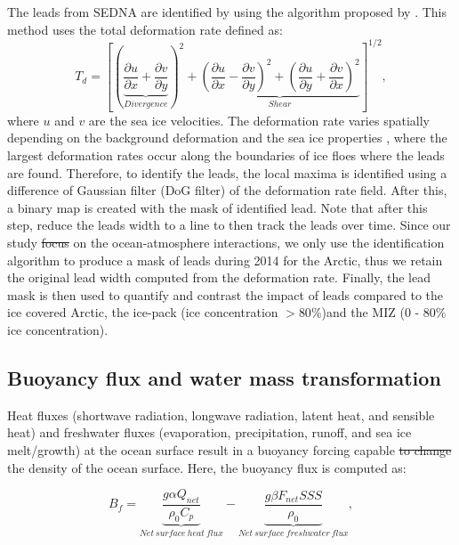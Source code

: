 \documentclass[lineno,sn-basic]{sn-jnl}%
\providecommand{\DIFadd}[1]{{\protect\color{blue}\uwave{#1}}} %
\providecommand{\DIFdel}[1]{{\protect\color{red}\sout{#1}}}                      %
\providecommand{\DIFaddbegin}{} %
\providecommand{\DIFaddend}{} %
\providecommand{\DIFdelbegin}{} %
\providecommand{\DIFdelend}{} %
\newcommand{\DIFscaledelfig}{0.5}
\newlength{\DIFdelgraphicswidth} %
\newlength{\DIFdelgraphicsheight} %
\newcommand{\DIFaddincludegraphics}[2][]{{\color{blue}\fbox{\DIFOincludegraphics[#1]{#2}}}} %
\newcommand{\DIFdelincludegraphics}[2][]{%
\sbox{\DIFdelgraphicsbox}{\DIFOincludegraphics[#1]{#2}}%
\settoboxwidth{\DIFdelgraphicswidth}{\DIFdelgraphicsbox} %
\settoboxtotalheight{\DIFdelgraphicsheight}{\DIFdelgraphicsbox} %
\scalebox{\DIFscaledelfig}{%
\parbox[b]{\DIFdelgraphicswidth}{\usebox{\DIFdelgraphicsbox}\\[-\baselineskip] \rule{\DIFdelgraphicswidth}{0em}}\llap{\resizebox{\DIFdelgraphicswidth}{\DIFdelgraphicsheight}{%
\setlength{\unitlength}{\DIFdelgraphicswidth}%
\begin{picture}(1,1)%
\thicklines\linethickness{2pt} %
{\color[rgb]{1,0,0}\put(0,0){\framebox(1,1){}}}%
{\color[rgb]{1,0,0}\put(0,0){\line( 1,1){1}}}%
{\color[rgb]{1,0,0}\put(0,1){\line(1,-1){1}}}%
\end{picture}%
}\hspace*{3pt}}} %
} %
\DeclareRobustCommand{\DIFaddbegin}{\DIFOaddbegin \let\includegraphics\DIFaddincludegraphics} %
\DeclareRobustCommand{\DIFaddend}{\DIFOaddend \let\includegraphics\DIFOincludegraphics} %
\DeclareRobustCommand{\DIFdelbegin}{\DIFOdelbegin \let\includegraphics\DIFdelincludegraphics} %
\DeclareRobustCommand{\DIFdelend}{\DIFOaddend \let\includegraphics\DIFOincludegraphics} %
\begin{document}
The leads from SEDNA are identified by using the algorithm proposed by \citet{Hutter_identification_2019}. This method uses the total deformation rate defined as: 
\begin{equation}
    T_d = \left[\left(\underbrace{\frac{\partial u}{\partial x} +\frac{\partial v}{\partial y}}_{Divergence}\right)^2 + \underbrace{\left(\frac{\partial u}{\partial x} - \frac{\partial v}{\partial y}\right)^2+ \left(\frac{\partial u}{\partial y} + \frac{\partial v}{\partial x}\right)^2}_{Shear}\right]^{1/2},
\end{equation}
where $u$ and $v$ are the sea ice velocities. The deformation rate varies spatially depending on the background deformation and the sea ice properties \citep{Reiser_LKF_2020}, where the largest deformation rates occur along the boundaries of ice floes where the leads are found. Therefore, to identify the leads, the local maxima is identified using a difference of Gaussian filter (DoG filter) of the deformation rate field. After this, a binary map is created with the mask of identified lead. Note that after this step, \citet{Hutter_identification_2019} reduce the leads width to a line to then track the leads over time. Since our study \DIFdelbegin \DIFdel{focus }\DIFdelend \DIFaddbegin \DIFadd{focuses }\DIFaddend on the ocean-atmosphere interactions, we only use the identification algorithm to produce a mask of leads during 2014 for the Arctic, thus we retain the original lead width computed from the deformation rate. Finally, the lead mask is then used to quantify and contrast the impact of leads compared to the ice covered Arctic, the ice-pack (ice concentration $> 80\%$)\DIFaddbegin \DIFadd{, }\DIFaddend and the MIZ (0 - 80\% ice concentration).

\subsection*{Buoyancy flux and water mass transformation}

Heat fluxes (shortwave radiation, longwave radiation, latent heat, and sensible heat) and freshwater fluxes (evaporation, precipitation, runoff, and sea ice melt/growth) at the ocean surface result in a buoyancy forcing capable \DIFdelbegin \DIFdel{to change }\DIFdelend \DIFaddbegin \DIFadd{of changing }\DIFaddend the density of the ocean surface. Here, the buoyancy flux is computed as:

\begin{equation}
    B_f = \underbrace{\frac{g \alpha Q_{net}}{\rho_0 C_p}}_{Net\ surface\ heat\ flux} - \underbrace{\frac{g \beta F_{net} SSS }{\rho_0}}_{Net\ surface\ freshwater\ flux},
\end{equation}
\end{document}
